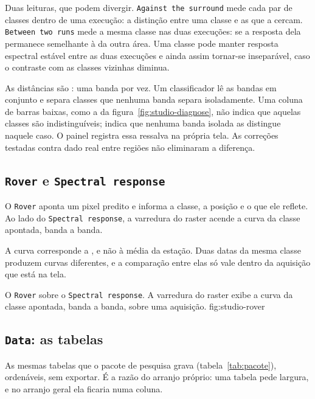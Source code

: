 \documentclass[12pt,a4paper]{article}
\begin{document}
Duas leituras, que podem divergir. \texttt{Against the surround} mede cada par
de classes dentro de uma execu\c{c}\~ao: a distin\c{c}\~ao entre uma classe e
as que a cercam. \texttt{Between two runs} mede a mesma classe nas duas
execu\c{c}\~oes: se a resposta dela permanece semelhante \`a da outra \'area.
Uma classe pode manter resposta espectral est\'avel entre as duas
execu\c{c}\~oes e ainda assim tornar-se insepar\'avel, caso o contraste com as
classes vizinhas diminua.

\begin{objecao}
As dist\^ancias s\~ao : uma banda por vez. Um classificador
l\^e as bandas em conjunto e separa classes que nenhuma banda separa
isoladamente. Uma coluna de barras baixas, como a da
figura~\ref{fig:studio-diagnose}, n\~ao indica que aquelas classes s\~ao
indistingu\'iveis; indica que nenhuma banda isolada as distingue naquele caso.
O painel registra essa ressalva na pr\'opria tela. As corre\c{c}\~oes testadas
contra dado real entre regi\~oes n\~ao eliminaram a diferen\c{c}a.
\end{objecao}

\subsection{\texttt{Rover} e \texttt{Spectral response}}

O \texttt{Rover} aponta um pixel predito e informa a classe, a posi\c{c}\~ao e
o que ele reflete. Ao lado do \texttt{Spectral response}, a varredura do raster
acende a curva da classe apontada, banda a banda.

\begin{objecao}
A curva corresponde a , e n\~ao \`a m\'edia da
esta\c{c}\~ao. Duas datas da mesma classe produzem curvas diferentes, e a
compara\c{c}\~ao entre elas s\'o vale dentro da aquisi\c{c}\~ao que est\'a na
tela.
\end{objecao}

  {O \texttt{Rover} sobre o \texttt{Spectral response}. A varredura do raster
   exibe a curva da classe apontada, banda a banda, sobre uma aquisi\c{c}\~ao.}
  {fig:studio-rover}

\subsection{\texttt{Data}: as tabelas}

As mesmas tabelas que o pacote de pesquisa grava
(tabela~\ref{tab:pacote}), orden\'aveis, sem exportar. \'E a raz\~ao do
arranjo pr\'oprio: uma tabela pede largura, e no arranjo geral ela ficaria numa
coluna.
\end{document}
